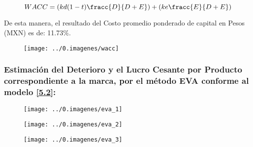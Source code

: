 \begin{enumerate}[a)]
$$WACC=\left(kd(1-t)\fracc{D}{D+E}\right)+\left(ke\fracc{E}{D+E}\right)$$

De esta manera, el resultado del Costo promedio ponderado de capital en Pesos (MXN) es de: 11.73\%.

 \begin{figure}
\centering
\texttt{[image: ../0.imagenes/wacc]}
\end{figure}

\end{enumerate}

\subsubsection{Estimación del Deterioro y el Lucro Cesante por Producto correspondiente a la marca, por el método EVA conforme al modelo \ref{5.2}:}

\begin{figure}
\centering
\texttt{[image: ../0.imagenes/eva\_1]}
\end{figure}

\begin{figure}
\centering
\texttt{[image: ../0.imagenes/eva\_2]}
\end{figure}

\begin{figure}
\centering
\texttt{[image: ../0.imagenes/eva\_3]}
\end{figure}

